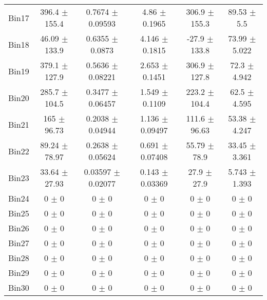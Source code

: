 \begin{tabular}{@{\extracolsep{4pt}}lccccc@{}}
     Bin17 & 396.4 $\pm$ 155.4 & 0.7674 $\pm$ 0.09593 & 4.86 $\pm$ 0.1965 & 306.9 $\pm$ 155.3 & 89.53 $\pm$ 5.5 \\ 
     Bin18 & 46.09 $\pm$ 133.9 & 0.6355 $\pm$ 0.0873 & 4.146 $\pm$ 0.1815 & -27.9 $\pm$ 133.8 & 73.99 $\pm$ 5.022 \\ 
     Bin19 & 379.1 $\pm$ 127.9 & 0.5636 $\pm$ 0.08221 & 2.653 $\pm$ 0.1451 & 306.9 $\pm$ 127.8 & 72.3 $\pm$ 4.942 \\ 
     Bin20 & 285.7 $\pm$ 104.5 & 0.3477 $\pm$ 0.06457 & 1.549 $\pm$ 0.1109 & 223.2 $\pm$ 104.4 & 62.5 $\pm$ 4.595 \\ 
     Bin21 & 165 $\pm$ 96.73 & 0.2038 $\pm$ 0.04944 & 1.136 $\pm$ 0.09497 & 111.6 $\pm$ 96.63 & 53.38 $\pm$ 4.247 \\ 
     Bin22 & 89.24 $\pm$ 78.97 & 0.2638 $\pm$ 0.05624 & 0.691 $\pm$ 0.07408 & 55.79 $\pm$ 78.9 & 33.45 $\pm$ 3.361 \\ 
     Bin23 & 33.64 $\pm$ 27.93 & 0.03597 $\pm$ 0.02077 & 0.143 $\pm$ 0.03369 & 27.9 $\pm$ 27.9 & 5.743 $\pm$ 1.393 \\ 
     Bin24 & 0 $\pm$ 0 & 0 $\pm$ 0 & 0 $\pm$ 0 & 0 $\pm$ 0 & 0 $\pm$ 0 \\ 
     Bin25 & 0 $\pm$ 0 & 0 $\pm$ 0 & 0 $\pm$ 0 & 0 $\pm$ 0 & 0 $\pm$ 0 \\ 
     Bin26 & 0 $\pm$ 0 & 0 $\pm$ 0 & 0 $\pm$ 0 & 0 $\pm$ 0 & 0 $\pm$ 0 \\ 
     Bin27 & 0 $\pm$ 0 & 0 $\pm$ 0 & 0 $\pm$ 0 & 0 $\pm$ 0 & 0 $\pm$ 0 \\ 
     Bin28 & 0 $\pm$ 0 & 0 $\pm$ 0 & 0 $\pm$ 0 & 0 $\pm$ 0 & 0 $\pm$ 0 \\ 
     Bin29 & 0 $\pm$ 0 & 0 $\pm$ 0 & 0 $\pm$ 0 & 0 $\pm$ 0 & 0 $\pm$ 0 \\ 
     Bin30 & 0 $\pm$ 0 & 0 $\pm$ 0 & 0 $\pm$ 0 & 0 $\pm$ 0 & 0 $\pm$ 0 \\ 
\hline\hline
  \end{tabular}
